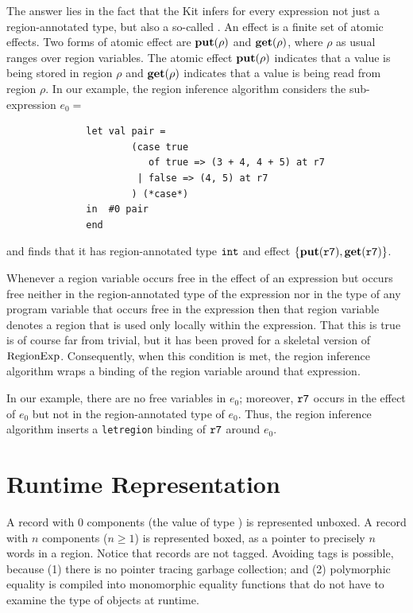 \documentclass[12pt]{book}
\begin{document}
The answer lies in the fact that the Kit infers for every expression
not just a region-annotated type, but also a so-called . 
An effect is a finite set of 
atomic effects. Two forms of atomic
effect are $\mathop{\bf put}\nolimits(\rho)$ and $\mathop{\bf get}\nolimits(\rho)$, where $\rho$ as usual ranges
over region variables. The atomic effect $\mathop{\bf put}\nolimits(\rho)$ indicates that a value is being stored in
region $\rho$ and $\mathop{\bf get}\nolimits(\rho)$ indicates that a value is being read from region $\rho$.
In our example, the region inference algorithm considers the sub-expression $e_0 = $
\begin{verbatim}
              let val pair = 
                      (case true 
                         of true => (3 + 4, 4 + 5) at r7 
                       | false => (4, 5) at r7
                      ) (*case*) 
              in  #0 pair
              end  \end{verbatim}
and finds that it has region-annotated type $\hbox{\tt int}$ and effect
$\{\mathop{\bf put}\nolimits(\hbox{\tt r7}), \mathop{\bf get}\nolimits(\hbox{\tt r7})\}$.

Whenever a region variable occurs free in the effect of an expression but occurs
free neither in the region-annotated type of the expression nor in the type of any
program variable that occurs free in the expression then that region variable denotes
a region that is used only locally within the expression.  
That this is true is of course far from trivial, but it
has been proved for a skeletal version of $\hbox{\rm RegionExp}$.  Consequently, 
when this condition is met, the region inference
algorithm wraps a  binding of the region variable
around that expression.

In our example, there are no free variables in $e_0$; moreover, $\hbox{\tt r7}$
occurs in the effect of $e_0$ but not in the region-annotated type of $e_0$. Thus,
the region inference algorithm inserts a {\tt letregion} binding of $\hbox{\tt r7}$
around $e_0$.

\section{Runtime Representation}
A 
%
record with 0 components
(the value of type ) is represented
unboxed.  A record with $n$ components ($n\geq 1$) is represented
boxed, as a pointer to precisely $n$ words in a region.  Notice that
records are not tagged. Avoiding tags is possible, because (1) there
is no pointer tracing garbage collection; and (2)
polymorphic equality is compiled into
monomorphic equality functions that do not
have to examine the type of objects at runtime.
\end{document}
